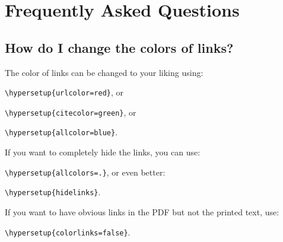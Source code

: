 
\chapter{Frequently Asked Questions} %

\label{AppendixA} %

\section{How do I change the colors of links?}

The color of links can be changed to your liking using:

{\small\verb!\hypersetup{urlcolor=red}!}, or

{\small\verb!\hypersetup{citecolor=green}!}, or

{\small\verb!\hypersetup{allcolor=blue}!}.

\noindent If you want to completely hide the links, you can use:

{\small\verb!\hypersetup{allcolors=.}!}, or even better: 

{\small\verb!\hypersetup{hidelinks}!}.

\noindent If you want to have obvious links in the PDF but not the printed text, use:

{\small\verb!\hypersetup{colorlinks=false}!}.

\Blindtext